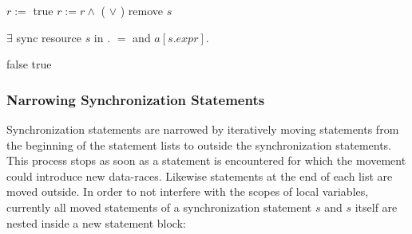 \begin{algorithmic}
\State {}
    \State $r :=$ true 
      \State $r := r \land$ ( $\lor$  )
    \EndFor
      \State remove $s$
    \EndIf
  \EndFor
\EndFor
\EndFunction
\end{algorithmic}


\begin{algorithmic}
\State {}
\State \Return $\exists$ sync resource $s$ in  $.$  $=$  and $a[s.\mathit{expr}]$.
\EndFunction
\end{algorithmic}

\begin{algorithmic}
\State {}
 
    \State \Return false
  \EndIf
\EndFor
\State \Return true
\EndFunction
\end{algorithmic}

\subsubsection{Narrowing Synchronization Statements}
Synchronization statements are narrowed by iteratively moving statements from the beginning of the statement lists to outside the synchronization statements. This process stops as soon as a statement is encountered for which the movement could introduce new data-races. Likewise statements at the end of each list are moved outside. In order to not interfere with the scopes of local variables, currently all moved statements of a synchronization statement $s$ and $s$ itself are nested inside a new statement block:

